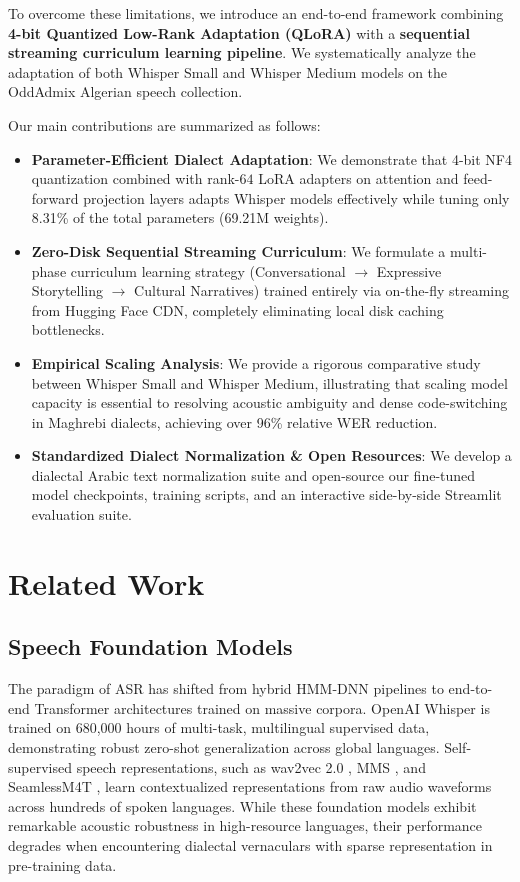 \documentclass[11pt,a4paper]{article}
\begin{document}
To overcome these limitations, we introduce an end-to-end framework combining \textbf{4-bit Quantized Low-Rank Adaptation (QLoRA)} \cite{dettmers2023qlora} with a \textbf{sequential streaming curriculum learning pipeline}. We systematically analyze the adaptation of both Whisper Small and Whisper Medium models on the OddAdmix Algerian speech collection. 

Our main contributions are summarized as follows:
\begin{itemize}[leftmargin=*]
    \item \textbf{Parameter-Efficient Dialect Adaptation}: We demonstrate that 4-bit NF4 quantization combined with rank-$64$ LoRA adapters on attention and feed-forward projection layers adapts Whisper models effectively while tuning only 8.31\% of the total parameters (69.21M weights).
    \item \textbf{Zero-Disk Sequential Streaming Curriculum}: We formulate a multi-phase curriculum learning strategy (Conversational $\rightarrow$ Expressive Storytelling $\rightarrow$ Cultural Narratives) trained entirely via on-the-fly streaming from Hugging Face CDN, completely eliminating local disk caching bottlenecks.
    \item \textbf{Empirical Scaling Analysis}: We provide a rigorous comparative study between Whisper Small and Whisper Medium, illustrating that scaling model capacity is essential to resolving acoustic ambiguity and dense code-switching in Maghrebi dialects, achieving over 96\% relative WER reduction.
    \item \textbf{Standardized Dialect Normalization \& Open Resources}: We develop a dialectal Arabic text normalization suite and open-source our fine-tuned model checkpoints, training scripts, and an interactive side-by-side Streamlit evaluation suite.
\end{itemize}

\section{Related Work}
\label{sec:related_work}

\subsection{Speech Foundation Models}
The paradigm of ASR has shifted from hybrid HMM-DNN pipelines to end-to-end Transformer architectures trained on massive corpora. OpenAI Whisper \cite{radford2022whisper} is trained on 680,000 hours of multi-task, multilingual supervised data, demonstrating robust zero-shot generalization across global languages. Self-supervised speech representations, such as wav2vec 2.0 \cite{baevski2020wav2vec2}, MMS \cite{pratap2023mms}, and SeamlessM4T \cite{barrault2023seamlessm4t}, learn contextualized representations from raw audio waveforms across hundreds of spoken languages. While these foundation models exhibit remarkable acoustic robustness in high-resource languages, their performance degrades when encountering dialectal vernaculars with sparse representation in pre-training data.
\end{document}
